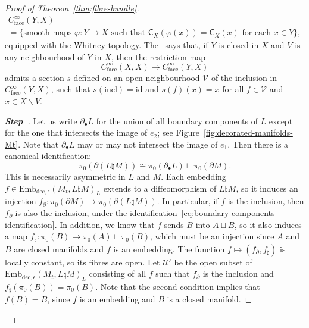 \documentclass[10pt,a4paper]{amsart}
\numberwithin{equation}{section}
\newcommand{\id}{\mathrm{id}}
\newcommand{\rincl}{\mathrm{incl}}
\newcommand{\rdec}{\mathrm{dec}}
\newcommand{\rface}{\mathrm{face}}
\newcommand{\sC}{\mathsf{C}}
\newcommand{\cU}{\mathcal{U}}
\newcommand{\cV}{\mathcal{V}}
\newcommand{\too}{\ensuremath{\longrightarrow}}
\newcommand{\embdece}{\ensuremath{\mathrm{Emb}_{\rdec,\epsilon}}}
\newcounter{stepcount}
\newenvironment{step}[1]{\refstepcounter{stepcount}\begin{proof}
[\textbf{Step~\thestepcount}]}{\let\qed\relax\end{proof}}
\theoremstyle{definition}
\theoremstyle{remark}
\begin{document}
\begin{proof}[Proof of Theorem~\ref{thm:fibre-bundle}]
\begin{multline*}
C^{\infty}_{\rface}(Y,X)\\
= \{ \text{smooth maps } \varphi \colon Y \to X \text{ such that } \sC_{X}(\varphi(x)) = \sC_{X}(x) \text{ for each } x \in Y \},
\end{multline*}
equipped with the Whitney topology. The~\cite[\emph{Extension Lemma} II.2.1.2]{Cerf1961Topologiedecertains} says that, if $Y$ is closed in $X$ and $V$ is any neighbourhood of $Y$ in $X$, then the restriction map
\[
C^{\infty}_{\rface}(X,X) \too C^{\infty}_{\rface}(Y,X)
\]
admits a section $s$ defined on an open neighbourhood $\cV$ of the inclusion in $C^{\infty}_{\rface}(Y,X)$, such that $s(\rincl) = \id$ and $s(f)(x) = x$ for all $f \in \cV$ and $x \in X \smallsetminus V$.


\begin{step}{{}}
Let us write $\partial_\bullet L$ for the union of all boundary components of $L$ except for the one that intersects the image of $e_{2}$; see Figure~\ref{fig:decorated-manifolds-Mt}. Note that $\partial_\bullet L$ may or may not intersect the image of $e_{1}$. Then there is a canonical identification:
\begin{equation}\label{eq:boundary-components-identification}
\pi_{0}(\partial(L\natural M)) \cong \pi_{0}(\partial_\bullet L) \sqcup \pi_{0}(\partial M).
\end{equation}
This is necessarily asymmetric in $L$ and $M$. Each embedding $f \in \embdece(M_t,L\natural M)_L$ extends to a diffeomorphism of $L \natural M$, so it induces an injection $f_\partial \colon \pi_{0}(\partial M) \to \pi_{0}(\partial (L\natural M))$. In particular, if $f$ is the inclusion, then $f_\partial$ is also the inclusion, under the identification~\eqref{eq:boundary-components-identification}. In addition, we know that $f$ sends $B$ into $A \sqcup B$, so it also induces a map $f_\sharp \colon \pi_{0}(B) \to \pi_{0}(A) \sqcup \pi_{0}(B)$, which must be an injection since $A$ and $B$ are closed manifolds and $f$ is an embedding. The function $f \mapsto (f_\partial,f_\sharp)$ is locally constant, so its fibres are open. Let $\cU'$ be the open subset of $\embdece(M_t,L\natural M)_L$ consisting of all $f$ such that $f_\partial$ is the inclusion and $f_\sharp(\pi_{0}(B)) = \pi_{0}(B)$. Note that the second condition implies that $f(B) = B$, since $f$ is an embedding and $B$ is a closed manifold.
\end{step}


\end{proof}
\end{document}
